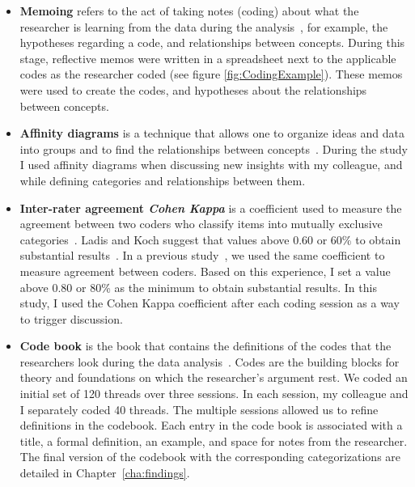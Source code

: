 \documentclass{sig-alternate-05-2015}
\begin{document}
	\begin{itemize}
		\item \textbf{Memoing} refers to the act of taking notes (coding) about what the researcher is learning from the data during the analysis~\cite{Groenewald2008}, for example, the hypotheses regarding a code, and relationships between concepts.
		During this stage, reflective memos were written in a spreadsheet next to the applicable codes as the researcher coded (see figure \ref{fig:CodingExample}).
		These memos were used to create the codes, and hypotheses about the relationships between concepts.

		\item \textbf{Affinity diagrams} is a technique that allows one to organize ideas and data into groups and to find the relationships between concepts~\cite{Scupin1997}.
		During the study I used affinity diagrams when discussing new insights with my colleague, and while defining categories and relationships between them.

		\item \textbf{Inter-rater agreement \textit{Cohen Kappa}} is a coefficient used to measure the agreement between two coders who classify items into mutually exclusive categories~\cite{Stemler2004}.
		Ladis and Koch suggest that values above 0.60 or 60\% to obtain substantial results~\cite{Landis1977}.
		In a previous study~\cite{Gomez2013}, we used the same coefficient to measure agreement between coders.
		Based on this experience, I set a value above 0.80 or 80\% as the minimum to obtain substantial results.
		In this study, I used the Cohen Kappa coefficient after each coding session as a way to trigger discussion.

		\item \textbf{Code book} is the book that contains the definitions of the codes that the researchers look during the data analysis~\cite{MacQueen1998}.
		Codes are the building blocks for theory and foundations on which the researcher's argument rest.
		We coded an initial set of 120 threads over three sessions.
		In each session, my colleague and I separately coded 40 threads.
		The multiple sessions allowed us to refine definitions in the codebook.
		Each entry in the code book is associated with a title, a formal definition, an example, and space for notes from the researcher.
		The final version of the codebook with the corresponding categorizations are detailed in Chapter~\ref{cha:findings}.
	\end{itemize}
\end{document}

